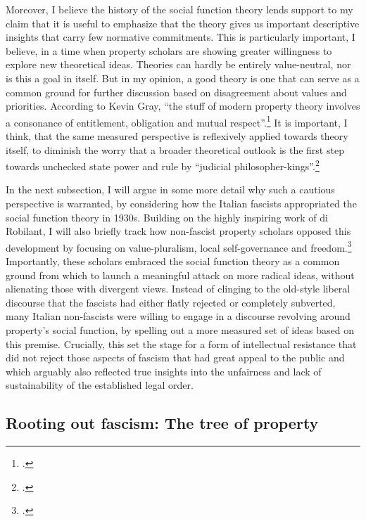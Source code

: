 \documentclass[12pt,a4paper]{book} %
\begin{document}
Moreover, I believe the history of the social function theory lends support to my claim that it is useful to emphasize that the theory gives us important descriptive insights that carry few normative commitments. This is particularly important, I believe, in a time when property scholars are showing greater willingness to explore new theoretical ideas. Theories can hardly be entirely value-neutral, nor is this a goal in itself. But in my opinion, a good theory is one that can serve as a common ground for further discussion based on disagreement about values and priorities. According to Kevin Gray, ``the stuff of modern property theory involves a consonance of entitlement, obligation and mutual respect''.\footcite[37]{gray11} It is important, I think, that the same measured perspective is reflexively applied towards theory itself, to diminish the worry that a broader theoretical outlook is the first step towards unchecked state power and rule by ``judicial philosopher-kings''.\footcite[944]{claeys09}

In the next subsection, I will argue in some more detail why such a cautious perspective is warranted, by considering how the Italian fascists appropriated the social function theory in 1930s. Building on the highly inspiring work of di Robilant, I will also briefly track how non-fascist property scholars opposed this development by focusing on value-pluralism, local self-governance and freedom.\footcite{robilant13} Importantly, these scholars embraced the social function theory as a common ground from which to launch a meaningful attack on more radical ideas, without alienating those with divergent views. Instead of clinging to the old-style liberal discourse that the fascists had either flatly rejected or completely subverted, many Italian non-fascists were willing to engage in a discourse revolving around property's social function, by spelling out a more measured set of ideas based on this premise. Crucially, this set the stage for a form of intellectual resistance that did not reject those aspects of fascism that had great appeal to the public and which arguably also reflected true insights into the unfairness and lack of sustainability of the established legal order.

\subsection{Rooting out fascism: {T}he tree of property}
\end{document}
